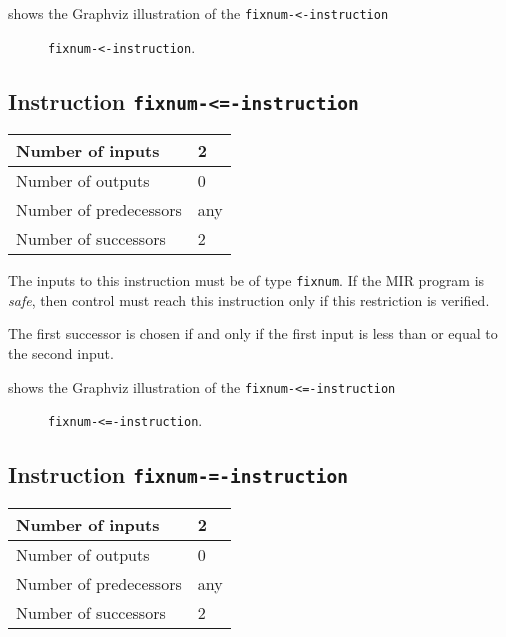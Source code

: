  shows the Graphviz illustration of the
\texttt{fixnum-<-instruction}

\begin{figure}
\begin{center}
\end{center}
\caption{\label{fig-fixnum-less-instruction}
\texttt{fixnum-<-instruction}.}
\end{figure}

\subsection{Instruction \texttt{fixnum-<=-instruction}}
\label{mir-instruction-fixnum-le}

\begin{tabular}{|l|l|}
\hline
Number of inputs & 2\\
\hline
Number of outputs & 0\\
\hline
Number of predecessors & any\\
\hline
Number of successors & 2\\
\hline
\end{tabular}

The inputs to this instruction must be of type \texttt{fixnum}.  If the
MIR program is \emph{safe}, then control must reach this instruction
only if this restriction is verified.

The first successor is chosen if and only if the first input is
less than or equal to the second input.

 shows the Graphviz illustration of the
\texttt{fixnum-<=-instruction}

\begin{figure}
\begin{center}
\end{center}
\caption{\label{fig-fixnum-le-instruction}
\texttt{fixnum-<=-instruction}.}
\end{figure}

\subsection{Instruction \texttt{fixnum-=-instruction}}
\label{mir-instruction-fixnum-equal}

\begin{tabular}{|l|l|}
\hline
Number of inputs & 2\\
\hline
Number of outputs & 0\\
\hline
Number of predecessors & any\\
\hline
Number of successors & 2\\
\hline
\end{tabular}

